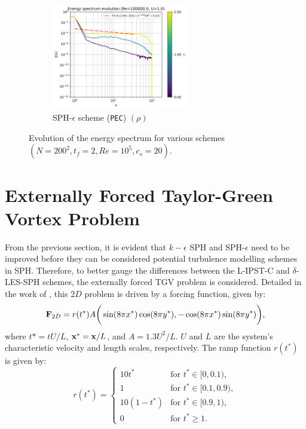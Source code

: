 \begin{figure}[htbp!]
\begin{subfigure}{7cm}
  \centering\includegraphics[width=6cm]{Code-Figures/long-tgv/c0_20_tait_hdx_2_pec_dtmul_1_mon2017_eps_0.5_no_n_o_files_50_nx_200_pst_10_re_100000_mon2017_tf_2/energy_spectrum_evolution_all.png}
  \caption{SPH-$\epsilon$ scheme (\texttt{PEC}) $(\rho)$}
  \end{subfigure}
  \caption{Evolution of the energy spectrum for various schemes $(N=200^2, t_f=2, Re=10^5, c_s=20)$.}
  \label{fig:ltgv-scheme-espec}
\end{figure}


\section{Externally Forced Taylor-Green Vortex Problem}

From the previous section, it is evident that $k-\epsilon$ SPH and SPH-$\epsilon$ need to be improved before they can be considered potential turbulence modelling schemes in SPH.
Therefore, to better gauge the differences between the L-IPST-C and $\delta$-LES-SPH schemes, the externally forced TGV problem is considered.
Detailed in the work of \cite{Colagrossi2021QuasiLagrangian}, this $2D$ problem is driven by a forcing function, given by:
\begin{equation}
  \mathbf{F}_{2D} = r(t^*) A \bigg( \sin(8\pi x^*) \cos(8\pi y^*), -\cos(8\pi x^*) \sin(8\pi y^*) \bigg),
\end{equation}
where $t*=tU/L$, $\mathbf{x}^* = \mathbf{x}/L$, and $A=1.3U^2/L$. $U$ and $L$ are the system's characteristic velocity and length scales, respectively.
The ramp function $r(t^*)$ is given by:
\begin{equation}
  r(t^*) = \begin{cases}
    10 t^* & \text{for } t^* \in [0, 0.1), \\
    1 & \text{for } t^* \in [0.1, 0.9), \\
    10 (1 - t^*) & \text{for } t^* \in [0.9, 1), \\
    0 & \text{for } t^* \geq 1.
  \end{cases}
\end{equation}

